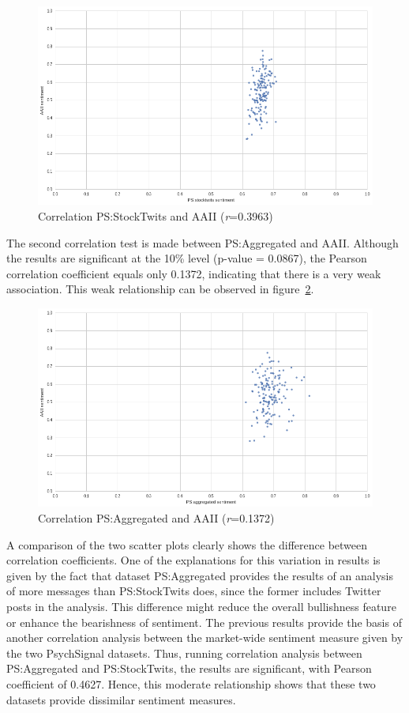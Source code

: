 \begin{figure}[ht]
\centering
\includegraphics[width=1\textwidth]{figures/figure10.png}
\caption{\label{fig:figure10}Correlation PS:StockTwits and AAII (\textit{r}=0.3963)}
\end{figure}

The second correlation test is made between PS:Aggregated and AAII. Although the results are significant at the 10\% level (p-value = 0.0867), the Pearson correlation coefficient equals only 0.1372, indicating that there is a very weak association. This weak relationship can be observed in figure~\ref{fig:figure11}.

\begin{figure}[ht]
\centering
\includegraphics[width=1\textwidth]{figures/figure11.png}
\caption{\label{fig:figure11}Correlation PS:Aggregated and AAII (\textit{r}=0.1372)}
\end{figure}

A comparison of the two scatter plots clearly shows the difference between correlation coefficients. One of the explanations for this variation in results is given by the fact that dataset PS:Aggregated provides the results of an analysis of more messages than PS:StockTwits does, since the former includes Twitter posts in the analysis. This difference might reduce the overall bullishness feature or enhance the bearishness of sentiment. The previous results provide the basis of another correlation analysis between the market-wide sentiment measure given by the two PsychSignal datasets. Thus, running correlation analysis between PS:Aggregated and PS:StockTwits, the results are significant, with Pearson coefficient of 0.4627. Hence, this moderate relationship shows that these two datasets provide dissimilar sentiment measures.

